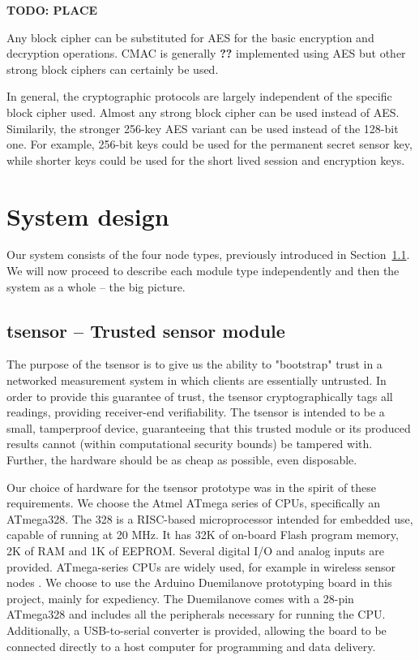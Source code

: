 \textbf{TODO: PLACE}

Any block cipher can be substituted for AES for the basic encryption and decryption operations. CMAC is generally \textbf{??} implemented using AES but other strong block ciphers can certainly be used. 

In general, the cryptographic protocols are largely independent of the specific block cipher used. Almost any strong block cipher can be used instead of AES. Similarily, the stronger 256-key AES variant can be used instead of the 128-bit one. For example, 256-bit keys could be used for the permanent secret sensor key, while shorter keys could be used for the short lived session and encryption keys.

\section{System design}

Our system consists of the four node types, previously introduced in Section~\ref{}. We will now proceed to describe each module type independently and then the system as a whole -- the big picture.

\subsection{tsensor -- Trusted sensor module}

The purpose of the tsensor is to give us the ability to "bootstrap" trust in a networked measurement system in which clients are essentially untrusted. In order to provide this guarantee of trust, the tsensor cryptographically tags all readings, providing receiver-end verifiability. The tsensor is intended to be a small, tamperproof device, guaranteeing that this trusted module or its produced results cannot (within computational security bounds) be tampered with. Further, the hardware should be as cheap as possible, even disposable.

Our choice of hardware for the tsensor prototype was in the spirit of these requirements. We choose the Atmel ATmega \cite{} series of CPUs, specifically an ATmega328. The 328 is a RISC-based microprocessor intended for embedded use, capable of running at 20 MHz. It has 32K of on-board Flash program memory, 2K of RAM and 1K of EEPROM. Several digital I/O and analog inputs are provided. ATmega-series CPUs are widely used, for example in wireless sensor nodes \cite{}.
%
We choose to use the Arduino Duemilanove \cite{} prototyping board in this project, mainly for expediency. The Duemilanove comes with a 28-pin ATmega328 and includes all the peripherals necessary for running the CPU. Additionally, a USB-to-serial converter is provided, allowing the board to be connected directly to a host computer for programming and data delivery.

